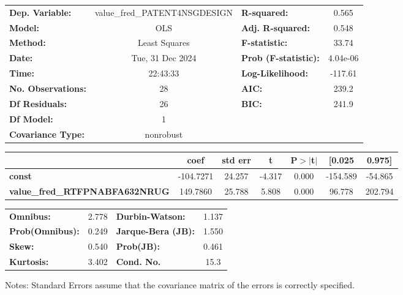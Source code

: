 \begin{center}
\begin{tabular}{lclc}
\toprule
\textbf{Dep. Variable:}                & value\_fred\_PATENT4NSGDESIGN & \textbf{  R-squared:         } &     0.565   \\
\textbf{Model:}                        &              OLS              & \textbf{  Adj. R-squared:    } &     0.548   \\
\textbf{Method:}                       &         Least Squares         & \textbf{  F-statistic:       } &     33.74   \\
\textbf{Date:}                         &        Tue, 31 Dec 2024       & \textbf{  Prob (F-statistic):} &  4.04e-06   \\
\textbf{Time:}                         &            22:43:33           & \textbf{  Log-Likelihood:    } &   -117.61   \\
\textbf{No. Observations:}             &                 28            & \textbf{  AIC:               } &     239.2   \\
\textbf{Df Residuals:}                 &                 26            & \textbf{  BIC:               } &     241.9   \\
\textbf{Df Model:}                     &                  1            & \textbf{                     } &             \\
\textbf{Covariance Type:}              &           nonrobust           & \textbf{                     } &             \\
\bottomrule
\end{tabular}
\begin{tabular}{lcccccc}
                                       & \textbf{coef} & \textbf{std err} & \textbf{t} & \textbf{P$> |$t$|$} & \textbf{[0.025} & \textbf{0.975]}  \\
\midrule
\textbf{const}                         &    -104.7271  &       24.257     &    -4.317  &         0.000        &     -154.589    &      -54.865     \\
\textbf{value\_fred\_RTFPNABFA632NRUG} &     149.7860  &       25.788     &     5.808  &         0.000        &       96.778    &      202.794     \\
\bottomrule
\end{tabular}
\begin{tabular}{lclc}
\textbf{Omnibus:}       &  2.778 & \textbf{  Durbin-Watson:     } &    1.137  \\
\textbf{Prob(Omnibus):} &  0.249 & \textbf{  Jarque-Bera (JB):  } &    1.550  \\
\textbf{Skew:}          &  0.540 & \textbf{  Prob(JB):          } &    0.461  \\
\textbf{Kurtosis:}      &  3.402 & \textbf{  Cond. No.          } &     15.3  \\
\bottomrule
\end{tabular}
\end{center}

Notes: \newline
 [1] Standard Errors assume that the covariance matrix of the errors is correctly specified.